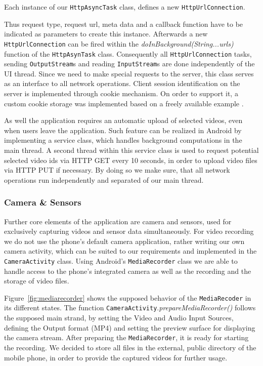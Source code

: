 \documentclass[conference]{IEEEtran}
\begin{document}
Each instance of our \texttt{HttpAsyncTask} class, defines a new \texttt{HttpUrlConnection}.

Thus request type, request url, meta data and a callback function have to be indicated as parameters to create this instance.
Afterwards a new \texttt{HttpUrlConnection} can be fired within the \textsl{doInBackground(String...urls)} function of the \texttt{HttpAsynTask} class. Consequently all \texttt{HttpUrlConnection} tasks,
sending \texttt{OutputStream}s and reading \texttt{InputStream}s are done independently of the UI thread.
Since we need to make special requests to the server, this class serves as an interface to all network operations.
Client session identification on the server is implemented through cookie mechanism. 
On order to support it, a custom cookie storage was implemented based on a freely available example \cite{so_java_cookies}.

As well the application requires an automatic upload of selected videos, even when users leave the application.
Such feature can be realized in Android by implementing a service class, which handles background computations in the main thread. 
A second thread within this service class is used to request potential selected video ids via HTTP GET every 10 seconds,
in order to upload video files via HTTP PUT if necessary.
By doing so we make sure, that all network operations run independently and separated of our main thread.

\subsubsection{Camera \& Sensors}
Further core elements of the application are camera and sensors, used for exclusively capturing videos and sensor data simultaneously.
For video recording we do not use the phone's default camera application,
rather writing our own camera activity, which can be suited to our requirements and implemented in the \texttt{CameraActivity} class.
Using Android's \texttt{MediaRecorder} class we are able to handle access to the phone's integrated camera
as well as the recording and the storage of video files.

Figure~\ref{fig:mediarecorder} \cite{mediarec_doc} shows the supposed behavior of the \texttt{MediaRecoder} in its different states. 
The function \texttt{CameraActivity}.\textsl{prepareMediaRecorder()} follows the supposed main strand,
by setting the Video and Audio Input Sources, defining the Output format (MP4) and setting the preview surface for displaying the camera stream.
After preparing the \texttt{MediaRecorder}, it is ready for starting the recording.
We decided to store all files in the external, public directory of the mobile phone, in order to provide the captured videos for further usage.
\end{document}
